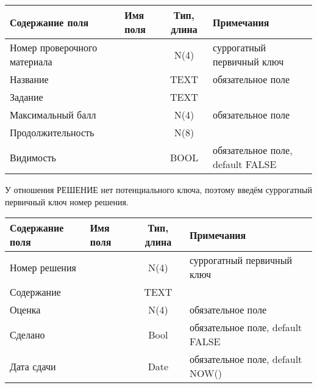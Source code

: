 \documentclass[a4paper,14pt]{article}
\begin{document}
\begin{table}[H]
	\begin{tabular}{|l|l|c|l|}
		\hline
		Содержание поля              & Имя поля & Тип, длина & Примечания                       \\ \hline
		Номер проверочного материала &          &    N(4)    & суррогатный первичный ключ       \\ \hline
		Название                     &          &    TEXT    & обязательное поле                \\ \hline
		Задание                      &          &    TEXT    &                                  \\ \hline
		Максимальный балл            &          &    N(4)    & обязательное поле                \\ \hline
		Продолжительность            &          &    N(8)    &                                  \\ \hline
		Видимость                    &          &    BOOL    & обязательное поле, default FALSE \\ \hline
	\end{tabular}
\end{table}


У отношения РЕШЕНИЕ нет потенциального ключа, поэтому введём суррогатный первичный ключ номер решения.

\begin{table}[H]
	\begin{tabular}{|l|l|c|l|}
		\hline
		Содержание поля & Имя поля & Тип, длина & Примечания                       \\ \hline
		Номер решения   &          &    N(4)    & суррогатный первичный ключ       \\ \hline
		Содержание      &          &    TEXT    &                                  \\ \hline
		Оценка          &          &    N(4)    & обязательное поле                \\ \hline
		Сделано         &          &    Bool    & обязательное поле, default FALSE \\ \hline
		Дата сдачи      &          &    Date    & обязательное поле, default NOW() \\ \hline
	\end{tabular}
\end{table}

%	
\end{document}
